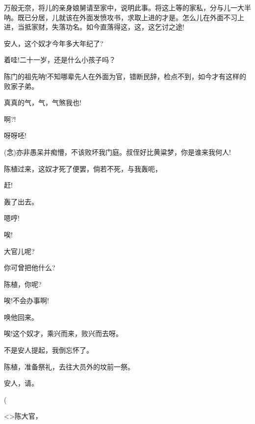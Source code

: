 {万般无奈，将儿的亲身娘舅请至家中，说明此事。将这上等的家私，分与儿一大半呐。既已分居，儿就该在外面发愤攻书，求取上进的才是。怎么儿在外面不习上进，当抵家财，失落功名。如今直落得这，这，这乞讨之途!

安人，这个奴才今年多大年纪了?

着哇!二十一岁，还是什么小孩子吗？

陈门的祖先呐!不知哪辈先人在外面为官，错断民辞，检点不到，如今才有这样的败家子弟。

真真的气，气，气煞我也!

啊?!

呀呀呸!

({\akai 念})亦非愚呆并痴懵，不该败坏我门庭。叔侄好比黄粱梦，你是谁来我何人!

陈植过来，这奴才死了便罢，倘若不死，与我轰呃，

赶!

轰了出去。

嗯哼!


唉!


大官儿呢?

你可曾把他什么?

陈植，你呢?

唉!不会办事啊!

唤他回来。

唉!这个奴才，乘兴而来，败兴而去呀。

不是安人提起，我倒忘怀了。

陈植，准备祭礼，去往大员外的坟前一祭。

安人，请。


(



\textless{}\!\textgreater{}陈大官，

}
